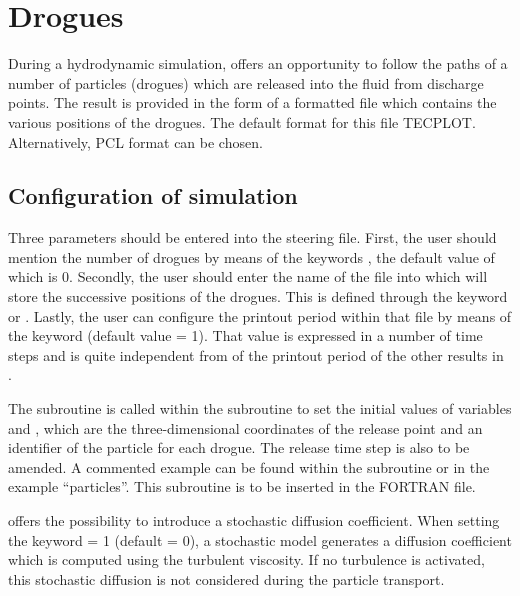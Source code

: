 \chapter{Drogues}
\label{sec:drogues}

During a hydrodynamic simulation,  offers an opportunity to follow the paths of a number of particles (drogues) which are released into the fluid from discharge points. The result is provided in the form of a formatted file which contains the various positions of the drogues. The default format for this file TECPLOT. Alternatively, PCL format can be chosen.

\section{Configuration of simulation}

Three parameters should be entered into the steering file. First, the user should mention the number of drogues by means of the keywords , the default value of which is 0. Secondly, the user should enter the name of the file into which  will store the successive positions of the drogues. This is defined through the keyword  or .  Lastly, the user can configure the printout period within that file by means of the keyword  (default value = 1). That value is expressed in a number of time steps and is quite independent from of the printout period of the other results in .

The subroutine  is called within the  subroutine to set the initial values of variables  and , which are the three-dimensional coordinates of the release point and an identifier of the particle for each drogue. The release time step is also to be amended. A commented example can be found within the subroutine  or in the example ``particles''. This subroutine is to be inserted in the FORTRAN file.

 offers the possibility to introduce a stochastic diffusion
coefficient.
When setting the keyword  = 1 (default = 0),
a stochastic model generates a diffusion coefficient which is computed using the
turbulent viscosity.
If no turbulence is activated, this stochastic diffusion is not considered
during the particle transport.
\\

